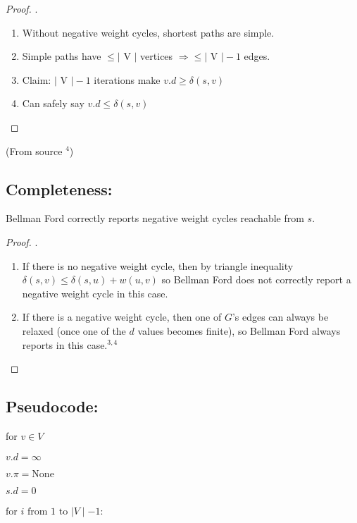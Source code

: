 \documentclass{article}
\begin{document}
\begin{proof} .
\begin{enumerate}

\item Without negative weight cycles, shortest paths are simple.

\item Simple paths have $\leq \mid$ V $\mid$ vertices $\Rightarrow \leq \mid$ V $\mid - 1$ edges.
\item Claim: $\mid$ V $\mid - 1$ iterations make $v.d \geq \delta(s,v)$
\item Can safely say $v.d \leq \delta(s,v)$
\end{enumerate}
\end{proof}
(From source $^4$)

\subsection{Completeness:}

Bellman Ford correctly reports negative weight cycles reachable from $s$.

\begin{proof}.
\begin{enumerate}

\item If there is no negative weight cycle, then by triangle inequality $\delta(s,v) \leq \delta(s,u) + w(u,v)$ so Bellman Ford does not correctly report a negative weight cycle in this case.

\item If there is a negative weight cycle, then one of $G$'s edges can always be relaxed (once one of the $d$ values becomes finite), so Bellman Ford always reports in this case.$^{3,4}$
\end{enumerate}
\end{proof}

\subsection{Pseudocode:}

for $v \in V$

\hspace{5 pt}  $v.d = \infty$

\hspace{5 pt} $v.\pi = \text{None}$

$s.d = 0$

$\text{for}$ \hspace{0.5 pt} $i$ \hspace{0.5 pt} $\text{from}$ \hspace{0.5 pt} $1$ \hspace{0.5 pt} $\text{to}$ \hspace{0.5 pt} $\mid V \mid -1:$
\end{document}

